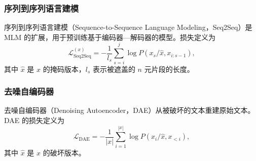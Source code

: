 \subsubsection{序列到序列语言建模}
序列到序列语言建模（Sequence-to-Sequence Language Modeling，Seq2Seq）是 MLM 的扩展，用于预训练基于编码器—解码器的模型。损失定义为
\begin{equation}
\mathcal{L}_{\mathrm{Seq2Seq}}^{(x)}
=-\frac{1}{l_s}\sum_{s=i}^{j}\log P(x_s/\hat{x},x_{i:s-1}),
\tag{2.32}
\end{equation}
其中 $\hat{x}$ 是 $x$ 的掩码版本，$l_s$ 表示被遮盖的 $n$ 元片段的长度。

\subsubsection{去噪自编码器}
去噪自编码器（Denoising Autoencoder，DAE）从被破坏的文本重建原始文本。DAE 的损失定义为
\begin{equation}
\mathcal{L}_{\mathrm{DAE}}
=-\frac{1}{|x|}\sum_{i=1}^{|x|}\log P(x_i/\hat{x},x_{<i}),
\tag{2.33}
\end{equation}
其中 $\hat{x}$ 是 $x$ 的破坏版本。
